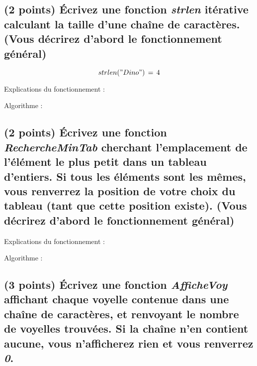 \documentclass[11pt,a4paper]{article}
\begin{document}
\smallskip


\clearpage


\subsection{(2 points) \'Ecrivez une fonction \og \textit{strlen} \fg{} itérative calculant la taille d'une chaîne de caractères. (Vous décrirez d'abord le fonctionnement général) }

\vspace*{-0.5cm}

\begin{center}

\begin{equation*}
strlen("Dino")  \, = \,  4
\end{equation*}

Explications du fonctionnement :

\bigskip

Algorithme :
\end{center}

\smallskip


\clearpage


\subsection{(2 points) \'Ecrivez une fonction \og \textit{RechercheMinTab} \fg{} cherchant l'emplacement de l'élément le plus petit dans un tableau d'entiers. Si tous les éléments sont les mêmes, vous renverrez la position de votre choix du tableau (tant que cette position existe). (Vous décrirez d'abord le fonctionnement général) }


\begin{center}
Explications du fonctionnement :

Algorithme :
\end{center}


\clearpage


\subsection{(3 points) \'Ecrivez une fonction \og \textit{AfficheVoy} \fg{} affichant chaque voyelle contenue dans une chaîne de caractères, et renvoyant le nombre de voyelles trouvées. Si la chaîne n'en contient aucune, vous n'afficherez rien et vous renverrez \textit{0}. }
\end{document}
